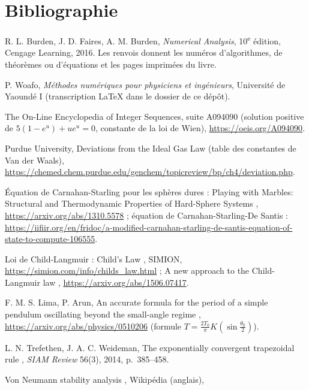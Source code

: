 \chapter*{Bibliographie}

\begin{description}[style=nextline,leftmargin=2.2cm,labelwidth=2cm]
  \item[{[BF]}] R. L. Burden, J. D. Faires, A. M. Burden, \textit{Numerical
    Analysis}, 10\textsuperscript{e} édition, Cengage Learning, 2016. Les
    renvois donnent les numéros d'algorithmes, de théorèmes ou d'équations et
    les pages imprimées du livre.
  \item[{[Cours]}] P. Woafo, \textit{Méthodes numériques pour physiciens et
    ingénieurs}, Université de Yaoundé I (transcription LaTeX dans le dossier
     de ce dépôt).
  \item[{[OEIS]}] The On-Line Encyclopedia of Integer Sequences, suite A094090
    (solution positive de $5(1 - e^{u}) + ue^{u} = 0$, constante de la loi de
    Wien), \url{https://oeis.org/A094090}.
  \item[{[VdW]}] Purdue University, \og Deviations from the Ideal Gas Law \fg{}
    (table des constantes de Van der Waals),
    \url{https://chemed.chem.purdue.edu/genchem/topicreview/bp/ch4/deviation.php}.
  \item[{[CSD]}] Équation de Carnahan-Starling pour les sphères dures :
    \og Playing with Marbles: Structural and Thermodynamic Properties of
    Hard-Sphere Systems \fg, \url{https://arxiv.org/abs/1310.5578} ;
    équation de Carnahan-Starling-De Santis :
    \url{https://iifiir.org/en/fridoc/a-modified-carnahan-starling-de-santis-equation-of-state-to-compute-106555}.
  \item[{[CL]}] Loi de Child-Langmuir : \og Child's Law \fg, SIMION,
    \url{https://simion.com/info/childs_law.html} ; \og A new approach to the
    Child-Langmuir law \fg, \url{https://arxiv.org/abs/1506.07417}.
  \item[{[LA]}] F. M. S. Lima, P. Arun, \og An accurate formula for the period of
    a simple pendulum oscillating beyond the small-angle regime \fg,
    \url{https://arxiv.org/abs/physics/0510206} (formule
    $T = \frac{2T_0}{\pi}K(\sin\frac{\theta_0}{2})$).
  \item[{[TW]}] L. N. Trefethen, J. A. C. Weideman, \og The exponentially
    convergent trapezoidal rule \fg, \textit{SIAM Review} 56(3), 2014,
    p.~385--458.
  \item[{[VN]}] \og Von Neumann stability analysis \fg, Wikipédia (anglais),

\end{description}

